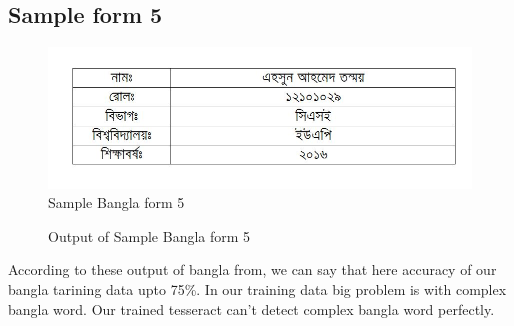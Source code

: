 \subsection{Sample form 5}
\begin{figure}[H]
\centering
\includegraphics[width=1\textwidth]{formBen05}
\caption {Sample Bangla form 5}
\label {fig:FormBan5}
\end{figure}
\begin{figure}[H]
\centering
{}
\caption {Output of Sample Bangla form 5}
\label {fig:FormBanOut5}
\end{figure}

According to these output of bangla from, we can say that here accuracy of our bangla tarining data upto 75\%. In our training data big problem is with complex bangla word. Our trained tesseract can't detect complex bangla word perfectly.